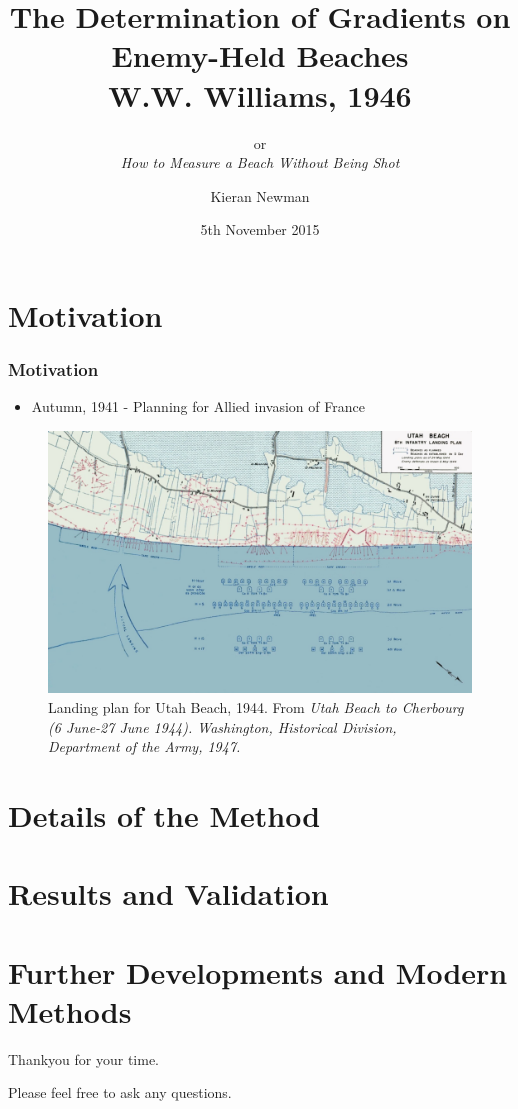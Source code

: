 \documentclass{beamer}
\begin{document}
\title[]{The Determination of Gradients on Enemy-Held Beaches\\ W.W. Williams, 1946}   %
\subtitle[]{or\\\emph{How to Measure a Beach Without Being Shot}}
\author{Kieran Newman} %
\date{5th November 2015} %

\frame{\titlepage}

\section{Motivation}

\begin{frame}
\frametitle{Motivation}
\begin{itemize}
\item Autumn, 1941 - Planning for Allied invasion of France
\end{itemize}
\begin{figure}
\includegraphics[width=\linewidth]{Utah_beach_landingplan}
\caption{Landing plan for Utah Beach, 1944. From \emph{Utah Beach to Cherbourg (6 June-27 June 1944). Washington, Historical Division, Department of the Army, 1947.}}
\end{figure}
\end{frame}

\section{Details of the Method}

\section{Results and Validation}

\section{Further Developments and Modern Methods}


\begin{frame}
\centering
\vspace{0.51in}
Thankyou for your time.


Please feel free to ask any questions.
\end{frame}


\end{document}
